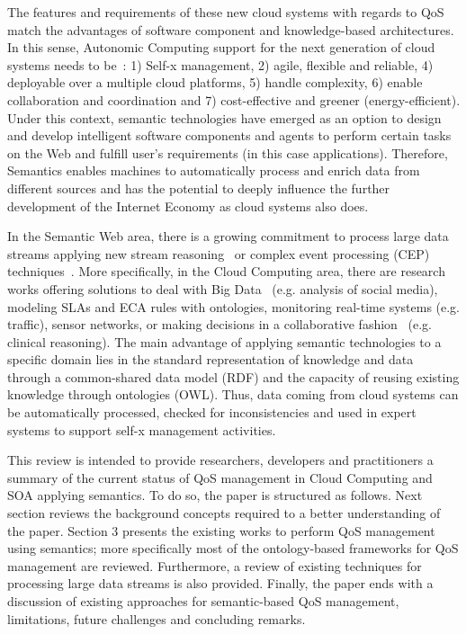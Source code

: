 The features and requirements of these new cloud systems with regards to QoS~\cite{Pedersen:2011:AMQ:2114495.2115542}
match the advantages of software component and knowledge-based architectures. In 
this sense, Autonomic Computing support for the next generation of cloud systems 
needs to be~\cite{Conejero:2012:MSQ:2357487.2357591,Pedersen:2011:AMQ:2114495.2115542}: 
1) Self-x management, 2) agile, flexible and reliable, 4) deployable over a multiple cloud platforms, 5) handle complexity, 6) enable 
collaboration and coordination and 7) cost-effective and greener 
(energy-efficient). Under this context, semantic technologies have emerged as an 
option to design and develop intelligent software components and agents to 
perform certain tasks on the Web and fulfill user’s requirements (in this case 
applications). Therefore, Semantics enables machines to automatically process 
and enrich data from different sources and has the potential to deeply influence 
the further development of the Internet Economy as cloud systems also does.

In the Semantic Web area, there is a growing commitment to process large data streams applying new stream reasoning~\cite{Bolles:2008:SSE:1789394.1789438,Barbieri:2010:EEC:1739041.1739095} 
or complex event processing (CEP) techniques~\cite{Anicic:2011:EUL:1963405.1963495}. More specifically, in the Cloud Computing area, there are research works offering 
solutions to deal with Big Data~\cite{Fan:2013:MBD:2481244.2481246} (e.g. analysis of social media), modeling SLAs and ECA rules with ontologies, 
monitoring real-time systems (e.g. traffic), sensor networks, or making decisions in a collaborative fashion~\cite{RodriGuez-GonzaLez:2012:UAP:2350799.2350907} (e.g. clinical reasoning). 
The main advantage of applying semantic technologies to a specific domain lies in the standard representation of knowledge and data through a common-shared data model (RDF) and the 
capacity of reusing existing knowledge through ontologies (OWL). Thus, data coming from cloud systems can be automatically processed, checked for inconsistencies and 
used in expert systems to support self-x management activities.


This review is intended to provide researchers, developers and practitioners a summary of the current status of QoS management in Cloud Computing and SOA applying semantics. To do so, the paper 
is structured as follows. Next section reviews the background concepts required to a better understanding of the paper. Section 3 presents the existing works to perform 
QoS management using semantics; more specifically most of the ontology-based frameworks for QoS management are reviewed. Furthermore, a review of 
existing techniques for processing large data streams is also provided. Finally, the paper ends with a discussion of existing approaches for semantic-based QoS management, 
limitations, future challenges and concluding remarks. 


